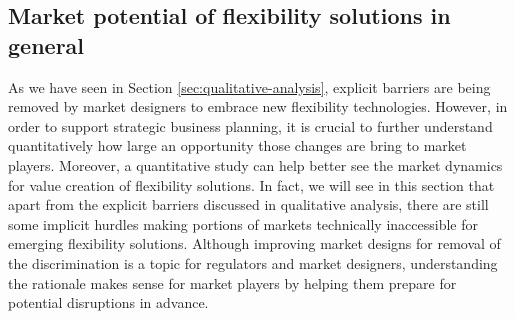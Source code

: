 

\subsection[Market potential of flexibility solutions in general]{Market potential of flexibility solutions in general%
	}
As we have seen in Section \ref{sec:qualitative-analysis}, explicit barriers are being removed by market designers to embrace new flexibility technologies. However, in order to support strategic business planning, it is crucial to further understand quantitatively how large an opportunity those changes are bring to market players. Moreover, a quantitative study can help better see the market dynamics for value creation of flexibility solutions. In fact, we will see in this section that apart from the explicit barriers discussed in qualitative analysis, there are still some implicit hurdles making portions of markets technically inaccessible for emerging flexibility solutions. Although improving market designs for removal of the discrimination is a topic for regulators and market designers, understanding the rationale makes sense for market players by helping them prepare for potential disruptions in advance.


